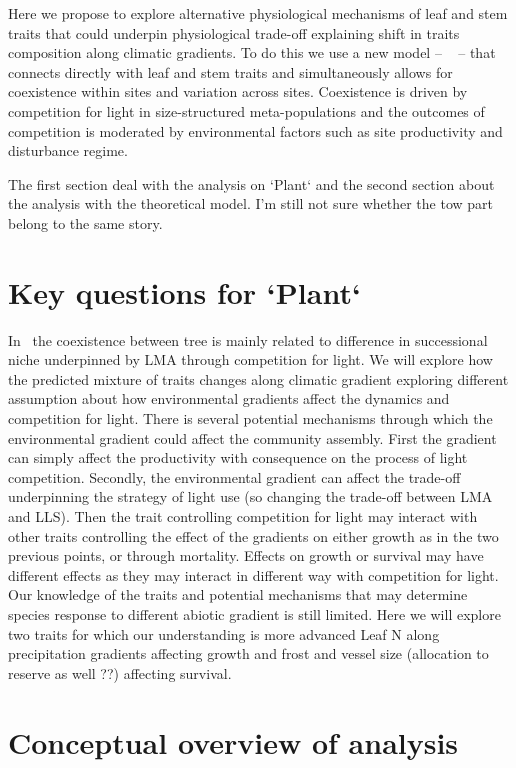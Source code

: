 \documentclass[a4paper,11pt]{article}
\begin{document}
Here we propose to explore alternative physiological mechanisms of leaf and stem traits that could underpin physiological trade-off explaining shift in traits composition along climatic gradients. To do this we use a new model -- \plant\ \citep{Falster-2016,Falster-2017} -- that connects directly with leaf and stem traits and simultaneously allows for coexistence within sites and variation across sites.  Coexistence is driven by competition for light in size-structured meta-populations and the outcomes of competition is moderated by environmental factors such as site productivity and disturbance regime.

The first section deal with the analysis on `Plant` and the second section about the analysis with the theoretical model. I'm still not sure whether the tow part belong to the same story.

\section{Key questions for `Plant`}

In \plant\ the coexistence between tree is mainly related to difference in successional niche underpinned by LMA through competition for light. We will explore how the predicted mixture of traits changes along climatic gradient exploring different assumption about how environmental gradients
affect the dynamics and competition for light. There is several
potential mechanisms through which the environmental gradient could
affect the community assembly. First the gradient can simply affect
the productivity with consequence on the process of light
competition. Secondly, the environmental gradient can affect the
trade-off underpinning the strategy of light use (so changing the
trade-off between LMA and LLS). Then the trait controlling competition
for light may interact with other traits controlling the effect of the
gradients on either growth as in the two previous points, or through
mortality. Effects on growth or survival may have different effects as
they may interact in different way with competition for light. Our knowledge of the traits and potential mechanisms that
may determine species response to different abiotic gradient is still
limited. Here we will explore two traits for which our understanding
is more advanced Leaf N along precipitation gradients affecting growth
and frost and vessel size (allocation to reserve as well ??) affecting
survival.

\section{Conceptual overview of analysis}
\end{document}
